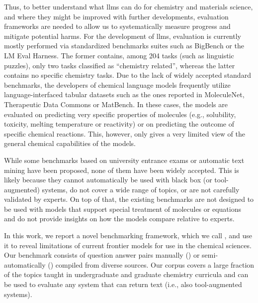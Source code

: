\documentclass[11pt, oneside]{article}
\begin{document}
\begin{refsection}
Thus, to better understand what \glspl{llm} can do for chemistry and materials science, and where they might be improved with further developments, evaluation frameworks are needed to allow us to systematically measure progress and mitigate potential harms.
For the development of \glspl{llm}, evaluation is currently mostly performed via standardized benchmarks suites such as BigBench\autocite{srivastava2022beyond} or the LM Eval Harness.\autocite{eval-harness}
The former contains, among 204 tasks (such as linguistic puzzles), only two tasks classified as \enquote{chemistry related}, whereas the latter contains no specific chemistry tasks.
Due to the lack of widely accepted standard benchmarks, the developers of chemical language models\autocite{jablonka2024leveraging, guo2023large, ahmad2022chemberta2, Cai_2024, frey2023neural} frequently utilize language-interfaced\autocite{dinh2022lift} tabular datasets such as the ones reported in MoleculeNet,\autocite{wu2018moleculenet} Therapeutic Data Commons\autocite{huang2021therapeutics} or MatBench.\autocite{dunn2020benchmarking}
In these cases, the models are  evaluated on predicting very specific properties of molecules (e.g., solubility, toxicity, melting temperature or reactivity) or on predicting the outcome of specific chemical reactions.
This, however, only gives a very limited view of the general chemical capabilities of the models.

While some benchmarks based on university entrance exams\autocite{Zaki_2024, arora2023llms} or automatic text mining\autocite{song2023honeybee, wei2021chemistryqa} have been proposed, none of them have been widely accepted.
This is likely because they cannot automatically be used with black box (or tool-augmented) systems, do not cover a wide range of topics, or are not carefully validated by experts.
On top of that, the existing benchmarks are not designed to be used with models that support special treatment of molecules or equations and do not provide insights on how the models compare relative to experts.

In this work, we report a novel benchmarking framework, which we call \chembench, and use it to reveal limitations of current frontier models for use in the chemical sciences.
Our benchmark consists of \xspace question answer pairs manually (\unskip) or semi-automatically (\unskip) compiled from diverse sources.
Our corpus covers a large fraction of the topics taught in undergraduate and graduate chemistry curricula and can be used to evaluate any system that can return text (i.e., also tool-augmented systems).


\end{refsection}
\end{document}

